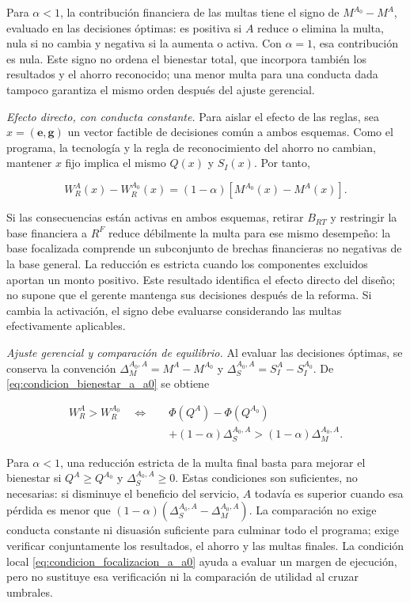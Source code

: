 Para \(\alpha<1\), la contribución financiera de las multas tiene el signo de \(M^{A_0}-M^A\), evaluado en las decisiones óptimas: es positiva si \(A\) reduce o elimina la multa, nula si no cambia y negativa si la aumenta o activa. Con \(\alpha=1\), esa contribución es nula. Este signo no ordena el bienestar total, que incorpora también los resultados y el ahorro reconocido; una menor multa para una conducta dada tampoco garantiza el mismo orden después del ajuste gerencial.

\noindent\textit{Efecto directo, con conducta constante.} Para aislar el efecto de las reglas, sea \(x=(\mathbf e,\mathbf g)\) un vector factible de decisiones común a ambos esquemas. Como el programa, la tecnología y la regla de reconocimiento del ahorro no cambian, mantener \(x\) fijo implica el mismo \(Q(x)\) y \(S_I(x)\). Por tanto,

\begin{equation}
\label{eq:bienestar_a_a0_conducta_constante}
W_R^A(x)-W_R^{A_0}(x)
=(1-\alpha)\left[M^{A_0}(x)-M^A(x)\right].
\end{equation}

Si las consecuencias están activas en ambos esquemas, retirar \(B_{RT}\) y restringir la base financiera a \(R^F\) reduce débilmente la multa para ese mismo desempeño: la base focalizada comprende un subconjunto de brechas financieras no negativas de la base general. La reducción es estricta cuando los componentes excluidos aportan un monto positivo. Este resultado identifica el efecto directo del diseño; no supone que el gerente mantenga sus decisiones después de la reforma. Si cambia la activación, el signo debe evaluarse considerando las multas efectivamente aplicables.

\noindent\textit{Ajuste gerencial y comparación de equilibrio.} Al evaluar las decisiones óptimas, se conserva la convención \(\Delta_M^{A_0,A}=M^A-M^{A_0}\) y \(\Delta_S^{A_0,A}=S_I^A-S_I^{A_0}\). De \eqref{eq:condicion_bienestar_a_a0} se obtiene

\begin{equation}
\label{eq:bienestar_a_a0_ajuste_gerencial}
\begin{aligned}
W_R^A>W_R^{A_0}
\quad\Longleftrightarrow\quad&
\Phi(Q^A)-\Phi(Q^{A_0})\\
&+(1-\alpha)\Delta_S^{A_0,A}>(1-\alpha)\Delta_M^{A_0,A}.
\end{aligned}
\end{equation}

Para \(\alpha<1\), una reducción estricta de la multa final basta para mejorar el bienestar si \(Q^A\geq Q^{A_0}\) y \(\Delta_S^{A_0,A}\geq0\). Estas condiciones son suficientes, no necesarias: si disminuye el beneficio del servicio, \(A\) todavía es superior cuando esa pérdida es menor que \((1-\alpha)(\Delta_S^{A_0,A}-\Delta_M^{A_0,A})\). La comparación no exige conducta constante ni disuasión suficiente para culminar todo el programa; exige verificar conjuntamente los resultados, el ahorro y las multas finales. La condición local \eqref{eq:condicion_focalizacion_a_a0} ayuda a evaluar un margen de ejecución, pero no sustituye esa verificación ni la comparación de utilidad al cruzar umbrales.

